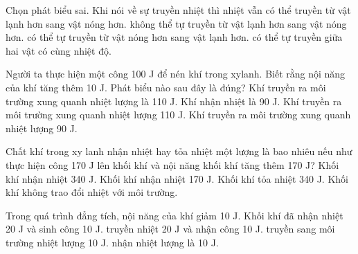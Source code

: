 \begin{ex}
Chọn phát biểu sai. Khi nói về sự truyền nhiệt thì nhiệt
\choice
{vẫn có thể truyền từ vật lạnh hơn sang vật nóng hơn.}
{không thể tự truyền từ vật lạnh hơn sang vật nóng hơn.}
{có thể tự truyền từ vật nóng hơn sang vật lạnh hơn.}
{\True có thể tự truyền giữa hai vật có cùng nhiệt độ.}
\end{ex}

\begin{ex}
Người ta thực hiện một công 100 J để nén khí trong xylanh. Biết rằng nội năng của khí tăng thêm 10 J. Phát biểu nào sau đây là đúng?
\choice
{Khí truyền ra môi trường xung quanh nhiệt lượng là 110 J.}
{Khí nhận nhiệt là 90 J.}
{Khí truyền ra môi trường xung quanh nhiệt lượng 110 J.}
{\True Khí truyền ra môi trường xung quanh nhiệt lượng 90 J.}
\end{ex}

\begin{ex}
Chất khí trong xy lanh nhận nhiệt hay tỏa nhiệt một lượng là bao nhiêu nếu như thực hiện công 170 J lên khối khí và nội năng khối khí tăng thêm 170 J?
\choice
{Khối khí nhận nhiệt 340 J.}
{Khối khí nhận nhiệt 170 J.}
{Khối khí tỏa nhiệt 340 J.}
{\True Khối khí không trao đổi nhiệt với môi trường.}
\end{ex}

\begin{ex}
Trong quá trình đẳng tích, nội năng của khí giảm 10 J. Khối khí đã
\choice
{nhận nhiệt 20 J và sinh công 10 J.}
{truyền nhiệt 20 J và nhận công 10 J.}
{\True truyền sang môi trường nhiệt lượng 10 J.}
{nhận nhiệt lượng là 10 J.}
\end{ex}


